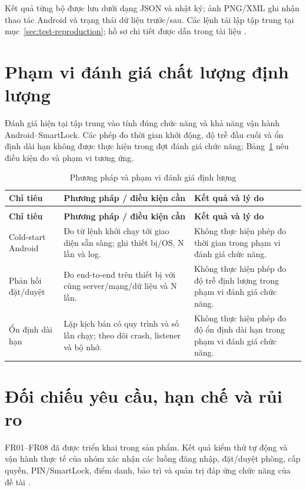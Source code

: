 Kết quả từng bộ được lưu dưới dạng JSON và nhật ký; ảnh PNG/XML ghi nhận thao tác Android và trạng thái dữ liệu trước/sau. Các lệnh tái lập tập trung tại mục~\ref{sec:test-reproduction}; hồ sơ chi tiết được dẫn trong tài liệu \cite{currenttests}.

\section{Phạm vi đánh giá chất lượng định lượng}
Đánh giá hiện tại tập trung vào tính đúng chức năng và khả năng vận hành Android--SmartLock. Các phép đo thời gian khởi động, độ trễ đầu cuối và ổn định dài hạn không được thực hiện trong đợt đánh giá chức năng; Bảng~\ref{tab:metrics} nêu điều kiện đo và phạm vi tương ứng.
{\tabletext\renewcommand{\arraystretch}{1.04}\begin{longtable}{>{\raggedright\arraybackslash}p{}>{\raggedright\arraybackslash}p{}>{\raggedright\arraybackslash}p{}}
\caption{Phương pháp và phạm vi đánh giá định lượng}\label{tab:metrics}\\
\toprule \textbf{Chỉ tiêu} & \textbf{Phương pháp / điều kiện cần} & \textbf{Kết quả và lý do}\\\midrule
\endfirsthead
\multicolumn{3}{l}{\small Phương pháp và phạm vi đánh giá định lượng (tiếp)}\\
\toprule \textbf{Chỉ tiêu} & \textbf{Phương pháp / điều kiện cần} & \textbf{Kết quả và lý do}\\\midrule
\endhead
\bottomrule\endlastfoot
Cold-start Android & Đo từ lệnh khởi chạy tới giao diện sẵn sàng; ghi thiết bị/OS, N lần và log. & Không thực hiện phép đo thời gian trong phạm vi đánh giá chức năng.\\
Phản hồi đặt/duyệt & Đo end-to-end trên thiết bị với cùng server/mạng/dữ liệu và N lần. & Không thực hiện phép đo độ trễ định lượng trong phạm vi đánh giá chức năng.\\
Ổn định dài hạn & Lặp kịch bản có quy trình và số lần chạy; theo dõi crash, listener và bộ nhớ. & Không thực hiện phép đo độ ổn định dài hạn trong phạm vi đánh giá chức năng.\\
\end{longtable}}

\section{Đối chiếu yêu cầu, hạn chế và rủi ro}
FR01--FR08 đã được triển khai trong sản phẩm. Kết quả kiểm thử tự động và vận hành thực tế của nhóm xác nhận các luồng đăng nhập, đặt/duyệt phòng, cấp quyền, PIN/SmartLock, điểm danh, bảo trì và quản trị đáp ứng chức năng của đề tài \cite{systemacceptance}.

